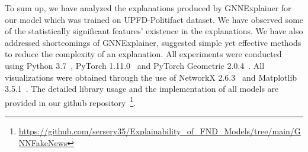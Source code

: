 To sum up, we have analyzed the explanations produced by GNNExplainer for our model which was trained on UPFD-Politifact dataset. We have observed some of the statistically significant features' existence in the explanations. We have also addressed shortcomings of GNNExplainer, suggested simple yet effective methods to reduce the complexity of an explanation. All experiments were conducted using Python 3.7~\parencite{Python_Rossum}, PyTorch 1.11.0~\parencite{PyTorch_Paszke} and PyTorch Geometric 2.0.4~\parencite{PyTorchGeometric_Fey}. All visualizations were obtained through the use of NetworkX 2.6.3~\parencite{NetworkX_Hagberg} and Matplotlib 3.5.1~\parencite{Matplotlib_Hunter}. The detailed library usage and the implementation of all models are provided in our github repository~\footnote{\url{https://github.com/sersery35/Explainability_of_FND_Models/tree/main/GNNFakeNews}}.